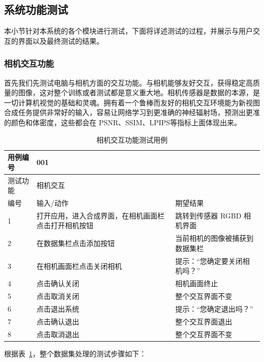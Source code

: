 \subsection{系统功能测试}
本小节针对本系统的各个模块进行测试，下面将详述测试的过程，并展示与用户交互的界面以及最终测试的结果。
\subsubsection{相机交互功能}
首先我们先测试电脑与相机方面的交互功能。与相机能够友好交互，获得稳定高质量的图像，这对整个训练或者测试都是意义重大地。相机传感器是数据的本源，是一切计算机视觉的基础和灵魂。拥有着一个鲁棒而友好的相机交互环境能为新视图合成任务提供非常好的输入，容易让网络学习到更准确的神经辐射场，预测出更准的颜色和体密度，这些都会在 PSNR、SSIM、LPIPS等指标上面体现出来。
\newpage
\begin{table}[t]
  \centering
  \small{}\setlength{}
  \caption{相机交互功能测试用例}
  \begin{tabular}{|p{2cm}<{\centering}|p{4cm}<{\centering}|p{4cm}<{\centering}|}
    \hline
    用例编号 & \multicolumn{2}{|l|}{001}       \\
    \hline
    测试功能 & \multicolumn{2}{|l|}{相机交互}       \\
    \hline
    编号 & 输入/动作 & 期望结果 \\
    \hline
    1 & 打开应用，进入合成界面，在相机画面栏点击打开相机按钮 & 跳转到传感器 RGBD 相机界面 \\
    \hline
    2 & 在数据集栏点击添加按钮 & 当前相机的图像被捕获到数据集栏 \\
    \hline
    3 & 在相机画面栏点击关闭相机 & 提示：“您确定要关闭相机吗？” \\
    \hline
    4 & 点击确认关闭 & 相机画面终止 \\
    \hline
    5 & 点击取消关闭 & 整个交互界面不变 \\
    \hline
    6 & 点击退出系统 & 提示：“您确定退出吗？” \\
    \hline
    7 & 点击确认退出 & 整个交互界面退出 \\
    \hline
    8 & 点击取消退出 & 整个交互界面不变 \\
    \hline
  \end{tabular}
  \label{tab:camera}
\end{table}
根据表~\ref{tab:camera}，整个数据集处理的测试步骤如下：
